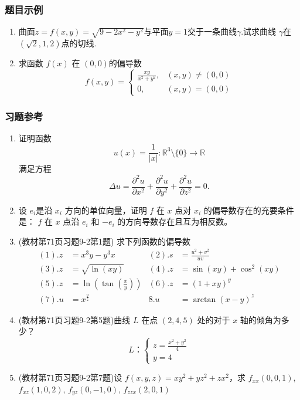 \subsubsection{题目示例}
\begin{enumerate}
\item 曲面$z=f(x,y)=\sqrt{9-2x^2-y^2}$与平面$y=1$交于一条曲线$\gamma.$试求曲线
$\gamma$在$(\sqrt2,1,2)$点的切线.

\item 求函数 $f(x)$ 在 $(0,0)$的偏导数
$$
f(x,y)=\begin{cases}\frac{xy}{x^2+y^2},&(x,y)\neq(0,0)\\0,&(x,y)=(0,0) \end{cases}
$$

\end{enumerate}
\subsubsection{习题参考}
\begin{enumerate}
\item 证明函数
$$
u(x)=\frac1{|x|}:\mathbb{R}^3\setminus\{0\}\to\mathbb{R}
$$
满足方程
$$
\Delta u=\frac{\partial^2u}{\partial x^2}+\frac{\partial^2u}{\partial y^2}+\frac{\partial^2u}{\partial z^2}=0.
$$

\item 设 $e_i$是沿 $x_i$ 方向的单位向量，证明 $f$ 在 $x$ 点对 $x_i$ 的偏导数存在的充要条件是： $f$ 在 $x$ 点沿 $e_i$ 和 $-e_i$ 的方向导数存在且互为相反数。

\item (教材第71页习题9-2第1题) 求下列函数的偏导数
\begin{align*}
(1). z &= x^3y-y^3x  & (2). s &= \frac{u^2+v^2}{u v} \\
(3). z &= \sqrt{\ln(x y)} &   (4). z &= \sin(x y)  + \cos ^2(x y) \\
(5). z &= \ln(\tan(\frac{x}{y})) & (6). z &= (1+x y)^y \\
(7). u &= x^{\frac{y}{z}} & 8. u &= \arctan (x-y)^z 
\end{align*}

\item (教材第71页习题9-2第5题)曲线 $L$ 在点 $(2,4,5)$ 处的对于 $x$ 轴的倾角为多少？
$$
L：\left\{\begin{matrix}
z = \frac{x^2+y^2}{4}\\
y = 4
\end{matrix}\right.
$$

\item (教材第71页习题9-2第7题)设 $f(x,y,z) = x y^2+y z^2+z x^2$，求 $f_{xx}(0,0,1)$, $f_{xz}(1,0,2)$, $f_{yz}(0,-1,0)$, $f_{zzx}(2,0,1)$
\end{enumerate}

